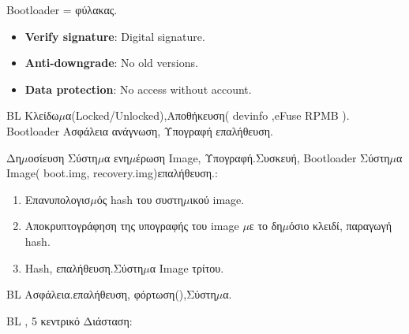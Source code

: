 


Bootloader = φύλακας.


\begin{itemize}
  \item \textbf{Verify signature}: Digital signature.
  \item \textbf{Anti-downgrade}: No old versions.
  \item \textbf{Data protection}: No access without account.
\end{itemize}


BL Κλείδω$\mu$α(Locked/Unlocked),Αποθήκευση( devinfo ,eFuse RPMB ). Bootloader Ασφάλεια ανάγνωση, Υπογραφή επαλήθευση.


Δη$\mu$οσίευση Σύστη$\mu$α ενη$\mu$έρωση Image, Υπογραφή.Συσκευή, Bootloader Σύστη$\mu$α Image( boot.img, recovery.img)επαλήθευση.:

\begin{enumerate}
  \item Επανυπολογισ$\mu$ός hash του συστη$\mu$ικού image.
  \item Αποκρυπτογράφηση της υπογραφής του image $\mu$ε το δη$\mu$όσιο κλειδί, παραγωγή hash.
  \item Hash, επαλήθευση.Σύστη$\mu$α Image τρίτου.
\end{enumerate}


BL Ασφάλεια.επαλήθευση, φόρτωση(),Σύστη$\mu$α.


BL , 5 κεντρικό Διάσταση:

